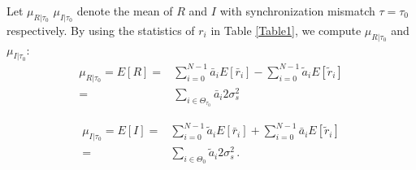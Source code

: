 Let $\mu_{R|\tau_0}$ $\mu_{I|\tau_0}$ denote the mean of $R$ and $I$ with synchronization mismatch $\tau=\tau_0$ respectively. By using the statistics of $r_i$ in Table \ref{Table1}, we compute  $\mu_{R|\tau_0}$ and  $\mu_{I|\tau_0}$:
\begin{equation}
  \begin{split}
	\mu_{R|\tau_0} =  E[R] = &\sum_{i=0}^{N-1}\bar{a}_iE[\bar{r}_i] - \sum_{i=0}^{N-1}\tilde{a}_iE[\tilde{r}_i]\\
	= &\sum_{i\in\Theta_{\tau_0}}\bar{a}_i2\sigma_s^2
  \end{split}
  \label{ER}
\end{equation}

\begin{equation}
  \begin{split}
	\mu_{I|\tau_0} =  E[I] = &\sum_{i=0}^{N-1}\tilde{a}_iE[\bar{r}_i] + \sum_{i=0}^{N-1}\bar{a}_iE[\tilde{r}_i]\\
	= &\sum_{i\in\Theta_0}\tilde{a}_i2\sigma_s^2\,.
  \end{split}
  \label{EI}
\end{equation}

